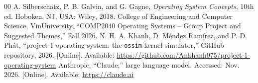 \documentclass[conference]{IEEEtran}
\begin{document}








\begin{thebibliography}{00}
 A. Silberschatz, P. B. Galvin, and G. Gagne, \textit{Operating System Concepts}, 10th ed. Hoboken, NJ, USA: Wiley, 2018.
 College of Engineering and Computer Science, VinUniversity, ``COMP2040 Operating Systems -- Group Project and Suggested Themes,'' Fall 2026.
 N. H. A. Khanh, D. Méndez Ramírez, and P. D. Ph\'{a}t, ``project-1-operating-system: the \texttt{ossim} kernel simulator,'' GitHub repository, 2026. [Online]. Available: \url{https://github.com/Ankhanh975/project-1-operating-system}
 Anthropic, ``Claude,'' large language model. Accessed: Nov. 2026. [Online]. Available: \url{https://claude.ai}
\end{thebibliography}

\clearpage
\appendix

\end{document}
